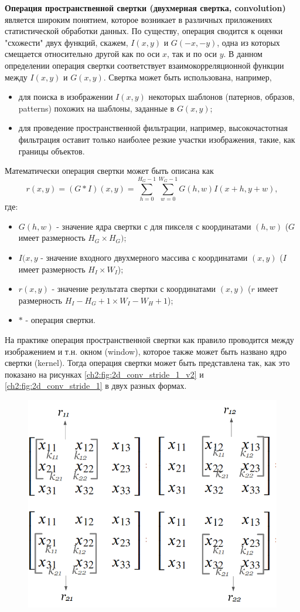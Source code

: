 \documentclass[12pt]{article}
\begin{document}
\begin{sloppypar}
\textbf{Операция пространственной свертки (двухмерная свертка, convolution)} является широким понятием, которое возникает в различных приложениях статистической обработки данных. По существу, операция сводится к оценки "схожести" двух функций, скажем, $I(x,y)$ и $G(-x,-y)$, одна из которых смещается относительно другой как по оси $x$, так и по оси $y$. В данном определении операция свертки соответствует взаимокорреляционной функции между $I(x,y)$ и $G(x,y)$. Свертка может быть использована, например,
\begin{itemize}
\item для поиска в изображении $I(x,y)$ некоторых шаблонов (патернов, образов, patterns) похожих на шаблоны, заданные в $G(x,y)$;
\item для проведение пространственной фильтрации, например, высокочастотная фильтрация оставит только наиболее резкие участки изображения, такие, как границы объектов. 
\end{itemize} 
Математически операция свертки может быть описана как
\begin{equation}
    r(x,y) = (G\ast I)(x,y) = \sum_{h=0}^{H_G-1}\sum_{w=0}^{W_G-1}G(h,w)I(x+h,y+w), 
    \label{ch2:eqn:conv} 
\end{equation}
где:
\begin{itemize}
\itemsep 0em 
    \item $G(h,w)$ - значение ядра свертки с для пикселя с координатами $(h,w)$ ($G$ имеет размерность $H_G \times H_G)$;
    \item $I(x,y$ - значение входного двухмерного массива с координатами $(x,y)$ ($I$ имеет размерность $H_I \times W_I$);
    \item $r(x,y)$ - значение результата свертки с координатами  $(x,y)$ ($r$ имеет размерность $H_I-H_G+1 \times W_I - W_H +1$);
    \item $\ast$ - операция свертки.
\end{itemize}
На практике операция пространственной свертки как правило проводится между изображением и т.н. окном (window), которое также может быть названо ядро свертки (kernel). Тогда операция
свертки может быть представлена так, как это показано на рисунках \ref{ch2:fig:2d_conv_stride_1_v2} и \ref{ch2:fig:2d_conv_stride_1} в двух разных формах. 
\begin{figure}[!h]
	\begin{center}
		\includegraphics[width=0.7\linewidth]{./figuresch1/2d_conv_stride_1_v2.png}

\end{center}
\end{figure}
\end{sloppypar}
\end{document}
